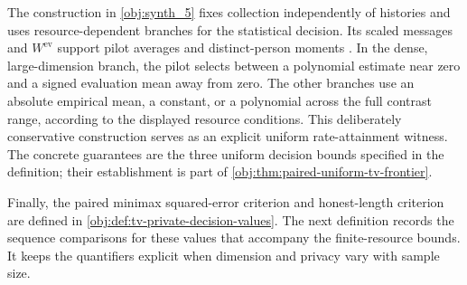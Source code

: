 \documentclass[11pt]{article}
\begin{document}
The construction in \cref{obj:synth_5} fixes collection independently of histories and uses resource-dependent branches for the statistical decision. Its scaled messages  and \(W^{\mathrm{ev}}\) support pilot averages and distinct-person moments . In the dense, large-dimension branch, the pilot selects between a polynomial estimate near zero and a signed evaluation mean away from zero. The other branches use an absolute empirical mean, a constant, or a polynomial across the full contrast range, according to the displayed resource conditions. This deliberately conservative construction serves as an explicit uniform rate-attainment witness. The concrete guarantees are the three uniform decision bounds specified in the definition; their establishment is part of \cref{obj:thm:paired-uniform-tv-frontier}.

Finally, the paired minimax squared-error criterion  and honest-length criterion  are defined in \cref{obj:def:tv-private-decision-values}. The next definition records the sequence comparisons for these values that accompany the finite-resource bounds. It keeps the quantifiers explicit when dimension and privacy vary with sample size.
\end{document}
